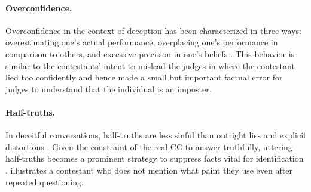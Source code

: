 \paragraph{Overconfidence.} 
Overconfidence in the context of deception has been characterized in three ways: overestimating one's actual performance, overplacing one's performance in comparison to others, and excessive precision in one's beliefs \cite{moore2008trouble}. This behavior is similar to the contestants' intent to mislead the judges in  where the contestant lied too confidently  \cite{serra2021mistakes} and hence made a small but important factual error for judges to understand that the individual is an imposter.

\paragraph{Half-truths.} In deceitful conversations, half-truths are less sinful than outright lies and explicit distortions \cite{carson2010lying}. Given the constraint of the real CC to answer truthfully, uttering half-truths becomes a prominent strategy to suppress facts vital for identification \cite{depaulo2003cues}.  illustrates a contestant who does not mention what paint they use even after repeated questioning.




